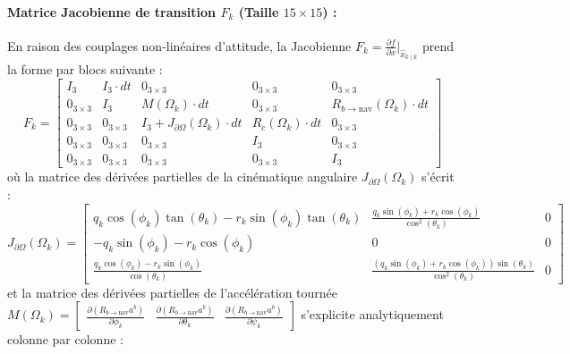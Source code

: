 \documentclass[../Formulations_Kalman.tex]{subfiles}
\begin{document}
\paragraph{Matrice Jacobienne de transition $F_k$ (Taille $15 \times 15$) :}
En raison des couplages non-linéaires d'attitude, la Jacobienne $F_k = \frac{\partial f}{\partial x}\big|_{\hat{x}_{k\mid k}}$ prend la forme par blocs suivante :
\begin{equation}
F_k = \begin{bmatrix}
I_3 & I_3 \cdot dt & 0_{3\times3} & 0_{3\times3} & 0_{3\times3} \\
0_{3\times3} & I_3 & M(\Omega_k) \cdot dt & 0_{3\times3} & R_{b \to \text{nav}}(\Omega_k) \cdot dt \\
0_{3\times3} & 0_{3\times3} & I_3 + J_{\partial \Omega}(\Omega_k) \cdot dt & R_{c}(\Omega_k) \cdot dt & 0_{3\times3} \\
0_{3\times3} & 0_{3\times3} & 0_{3\times3} & I_3 & 0_{3\times3} \\
0_{3\times3} & 0_{3\times3} & 0_{3\times3} & 0_{3\times3} & I_3
\end{bmatrix}
\end{equation}
où la matrice des dérivées partielles de la cinématique angulaire $J_{\partial \Omega}(\Omega_k)$ s'écrit :
\begin{equation}
J_{\partial \Omega}(\Omega_k) = \begin{bmatrix} 
q_k \cos(\phi_k)\tan(\theta_k) - r_k \sin(\phi_k)\tan(\theta_k) & \frac{q_k \sin(\phi_k) + r_k \cos(\phi_k)}{\cos^2(\theta_k)} & 0 \\ 
-q_k \sin(\phi_k) - r_k \cos(\phi_k) & 0 & 0 \\ 
\frac{q_k \cos(\phi_k) - r_k \sin(\phi_k)}{\cos(\theta_k)} & \frac{(q_k \sin(\phi_k) + r_k \cos(\phi_k))\sin(\theta_k)}{\cos^2(\theta_k)} & 0 
\end{bmatrix}
\end{equation}
et la matrice des dérivées partielles de l'accélération tournée $M(\Omega_k) = \begin{bmatrix} \frac{\partial (R_{b \to \text{nav}} a^b)}{\partial \phi_k} & \frac{\partial (R_{b \to \text{nav}} a^b)}{\partial \theta_k} & \frac{\partial (R_{b \to \text{nav}} a^b)}{\partial \psi_k} \end{bmatrix}$ s'explicite analytiquement colonne par colonne :
\end{document}
